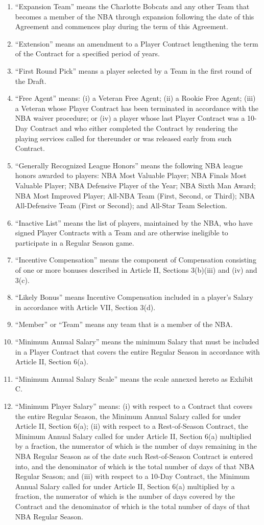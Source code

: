 \documentclass[
]{book}
\begin{document}
\begin{enumerate}
\item
  ``Expansion Team'' means the Charlotte Bobcats and any other Team that becomes a member of the NBA through expansion following the date of this Agreement and commences play during the term of this Agreement.
\item
  ``Extension'' means an amendment to a Player Contract lengthening the term of the Contract for a specified period of years.
\item
  ``First Round Pick'' means a player selected by a Team in the first round of the Draft.
\item
  ``Free Agent'' means: (i) a Veteran Free Agent; (ii) a Rookie Free Agent; (iii) a Veteran whose Player Contract has been terminated in accordance with the NBA waiver procedure; or (iv) a player whose last Player Contract was a 10-Day Contract and who either completed the Contract by rendering the playing services called for thereunder or was released early from such Contract.
\item
  ``Generally Recognized League Honors'' means the following NBA league honors awarded to players: NBA Most Valuable Player; NBA Finals Most Valuable Player; NBA Defensive Player of the Year; NBA Sixth Man Award; NBA Most Improved Player; All-NBA Team (First, Second, or Third); NBA All-Defensive Team (First or Second); and All-Star Team Selection.
\item
  ``Inactive List'' means the list of players, maintained by the NBA, who have signed Player Contracts with a Team and are otherwise ineligible to participate in a Regular Season game.
\item
  ``Incentive Compensation'' means the component of Compensation consisting of one or more bonuses described in Article II, Sections 3(b)(iii) and (iv) and 3(c).
\item
  ``Likely Bonus'' means Incentive Compensation included in a player's Salary in accordance with Article VII, Section 3(d).
\item
  ``Member'' or ``Team'' means any team that is a member of the NBA.
\item
  ``Minimum Annual Salary'' means the minimum Salary that must be included in a Player Contract that covers the entire Regular Season in accordance with Article II, Section 6(a).
\item
  ``Minimum Annual Salary Scale'' means the scale annexed hereto as Exhibit C.
\item
  ``Minimum Player Salary'' means: (i) with respect to a Contract that covers the entire Regular Season, the Minimum Annual Salary called for under Article II, Section 6(a); (ii) with respect to a Rest-of-Season Contract, the Minimum Annual Salary called for under Article II, Section 6(a) multiplied by a fraction, the numerator of which is the number of days remaining in the NBA Regular Season as of the date such Rest-of-Season Contract is entered into, and the denominator of which is the total number of days of that NBA Regular Season; and (iii) with respect to a 10-Day Contract, the Minimum Annual Salary called for under Article II, Section 6(a) multiplied by a fraction, the numerator of which is the number of days covered by the Contract and the denominator of which is the total number of days of that NBA Regular Season.

\end{enumerate}
\end{document}
